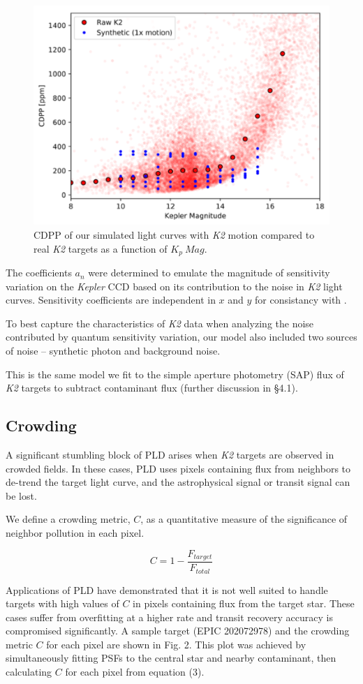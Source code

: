 \documentclass[12pt,preprint]{aastex}
\begin{document}
\begin{figure}[h]
	\centering
	\includegraphics[width=.5\linewidth]{1xmotion.png}
	\caption{CDPP of our simulated light curves with \textit{K2} motion compared to real \textit{K2} targets as a function of $K_p\ Mag$.}
	\label{fig:1motion}
\end{figure}

The coefficients $a_n$ were determined to emulate the magnitude of sensitivity variation on the \textit{Kepler} CCD based on its contribution to the noise in \textit{K2} light curves. Sensitivity coefficients are independent in $x$ and $y$ for consistancy with \cite{toyozumi_ashley_2005}.

To best capture the characteristics of \textit{K2} data when analyzing the noise contributed by quantum sensitivity variation, our model also included two sources of noise -- synthetic photon and background noise.

This is the same model we fit to the simple aperture photometry (SAP) flux of \textit{K2} targets to subtract contaminant flux (further discussion in \S 4.1).

\subsection{Crowding}

A significant stumbling block of PLD arises when \textit{K2} targets are observed in crowded fields. In these cases, PLD uses pixels containing flux from neighbors to de-trend the target light curve, and the astrophysical signal or transit signal can be lost.

We define a crowding metric, $C$, as a quantitative measure of the significance of neighbor pollution in each pixel.

\[
\tag{4}
C = 1 - \frac{F_{target}}{F_{total}}
\]

Applications of PLD have demonstrated that it is not well suited to handle targets with high values of $C$ in pixels containing flux from the target star. These cases suffer from overfitting at a higher rate and transit recovery accuracy is compromised significantly. A sample target (EPIC 202072978) and the crowding metric $C$ for each pixel are shown in Fig. 2. This plot was achieved by simultaneously fitting PSFs to the central star and nearby contaminant, then calculating $C$ for each pixel from equation (3).
\end{document}
